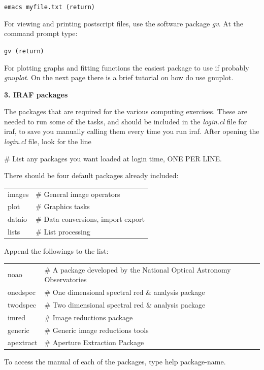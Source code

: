 \documentclass[12pt]{article}
\begin{document}
{\tt emacs myfile.txt (return)}         

For viewing and printing postscript files, use the software package
{\it gv}. At the command prompt type:

{\tt gv (return)}

For plotting graphs and fitting functions the easiest package to use
if probably {\it gnuplot}. On the next page there is a brief tutorial
on how do use gnuplot.\\

\newpage
\begin{center}
{\large{\bf 3. IRAF packages}}
\end{center}

The packages that are required for the various computing exercises.  These are needed to run some of the tasks, and should be included in the {\it login.cl} file for {\sc iraf}, to save you manually calling them every time you run {\sc iraf}. After opening the {\it login.cl} file, look for the line 

{\sc \# List any packages you want loaded at login time, ONE PER LINE.}

There should be four default packages already included:

\begin{tabular}{ll}
{\sc images}          &\# General image operators\\
{\sc plot}            &\# Graphics tasks\\
{\sc dataio}          &\# Data conversions, import export\\
{\sc lists}           &\# List processing
\end{tabular}

Append the followings to the list:

\begin{tabular}{ll}
{\sc noao}            &\# A package developed by the National Optical Astronomy Observatories\\
{\sc onedspec}        &\# One dimensional spectral red \& analysis package\\
{\sc twodspec}        &\# Two dimensional spectral red \& analysis package\\
{\sc imred}           &\# Image reductions package\\
{\sc generic}         &\# Generic image reductions tools\\
{\sc apextract}       &\# Aperture Extraction Package
\end{tabular}

To access the manual of each of the packages, type {\sc help package-name}.
\end{document}
